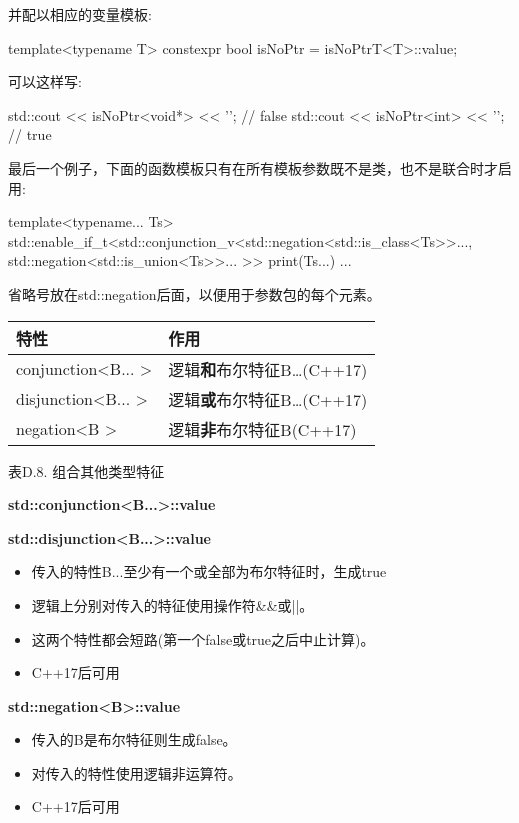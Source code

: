 并配以相应的变量模板:

\begin{cpp}
template<typename T>
constexpr bool isNoPtr = isNoPtrT<T>::value;
\end{cpp}

可以这样写:

\begin{cpp}
std::cout << isNoPtr<void*> << ’\n’; // false
std::cout << isNoPtr<int> << ’\n’; // true
\end{cpp}

最后一个例子，下面的函数模板只有在所有模板参数既不是类，也不是联合时才启用:

\begin{cpp}
template<typename... Ts>
std::enable_if_t<std::conjunction_v<std::negation<std::is_class<Ts>>...,
									std::negation<std::is_union<Ts>>...
									>>
print(Ts...)
{
	...
}
\end{cpp}

省略号放在std::negation后面，以便用于参数包的每个元素。

\begin{table}[H]
	\begin{center}
	\begin{tabular}{l|l}
		\hline
		\textbf{特性}                            & \textbf{作用}                                   \\ \hline
		conjunction\textless{}B... \textgreater{} & 逻辑\textbf{和}布尔特征B…(C++17) \\ \hline
		disjunction\textless{}B... \textgreater{} & 逻辑\textbf{或}布尔特征B…(C++17)  \\ \hline
		negation\textless{}B \textgreater{}       & 逻辑\textbf{非}布尔特征B(C++17)     \\ \hline
	\end{tabular}
	\end{center}
\end{table}

\begin{center}
表D.8. 组合其他类型特征
\end{center}

\textbf{std::conjunction<B...>::value}

\textbf{std::disjunction<B...>::value}

\begin{itemize}
\item 
传入的特性B...至少有一个或全部为布尔特征时，生成true

\item 
逻辑上分别对传入的特征使用操作符\&\&或||。

\item 
这两个特性都会短路(第一个false或true之后中止计算)。

\item 
C++17后可用
\end{itemize}

\textbf{std::negation<B>::value}

\begin{itemize}
\item 
传入的B是布尔特征则生成false。

\item 
对传入的特性使用逻辑非运算符。

\item 
C++17后可用
\end{itemize}












